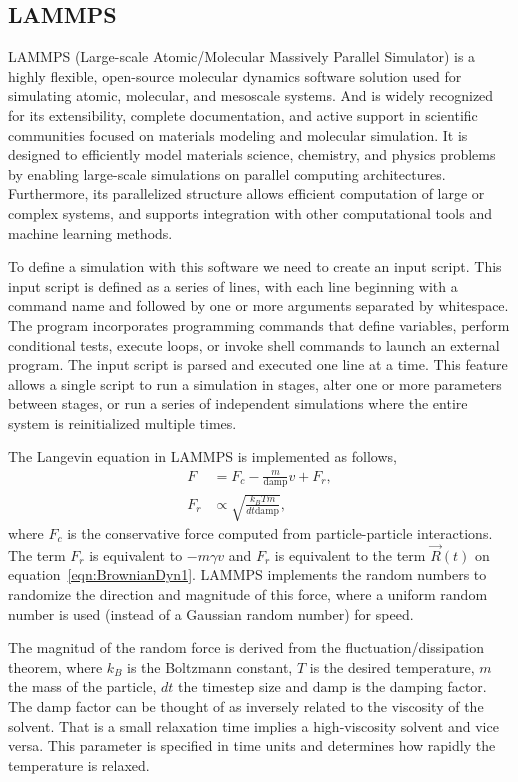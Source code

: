 \subsection{LAMMPS}

LAMMPS (Large-scale Atomic/Molecular Massively Parallel Simulator) is a highly flexible, open-source molecular dynamics software solution used for simulating atomic, molecular, and mesoscale systems. 
And is widely recognized for its extensibility, complete documentation, and active support in scientific communities focused on materials modeling and molecular simulation.
It is designed to efficiently model materials science, chemistry, and physics problems by enabling large-scale simulations on parallel computing architectures.
Furthermore, its parallelized structure allows efficient computation of large or complex systems, and supports integration with other computational tools and machine learning methods.

To define a simulation with this software we need to create an input script.
This input script is defined as a series of lines, with each line beginning with a command name and followed by one or more arguments separated by whitespace.
The program incorporates programming commands that define variables, perform conditional tests, execute loops, or invoke shell commands to launch an external program.
The input script is parsed and executed one line at a time. 
This feature allows a single script to run a simulation in stages, alter one or more parameters between stages, or run a series of independent simulations where the entire system is reinitialized multiple times.

The Langevin equation in LAMMPS is implemented as follows,
\begin{align}
    F &= F_c -\frac{m}{\mathrm{damp}}v + F_r,\label{eqn:MolDylammps1} \\
    F_r &\propto\sqrt{\frac{k_B T m}{dt\mathrm{damp}}},\label{eqn:MolDylammps2}
\end{align}
where $F_c$ is the conservative force computed from particle-particle interactions.
The term $F_r$ is equivalent to $-m\gamma v$ and $F_r$ is equivalent to the term $\vec{R}(t)$ on equation~\eqref{eqn:BrownianDyn1}.
LAMMPS implements the random numbers to randomize the direction and magnitude of this force, where a uniform random number is used (instead of a Gaussian random number) for speed.

The magnitud of the random force is derived from the fluctuation/dissipation theorem, where $k_B$ is the Boltzmann constant, $T$ is the desired temperature, $m$ the mass of the particle, $dt$ the timestep size and $\mathrm{damp}$ is the damping factor.
The damp factor can be thought of as inversely related to the viscosity of the solvent.
That is a small relaxation time implies a high-viscosity solvent and vice versa.
This parameter is specified in time units and determines how rapidly the temperature is relaxed.


